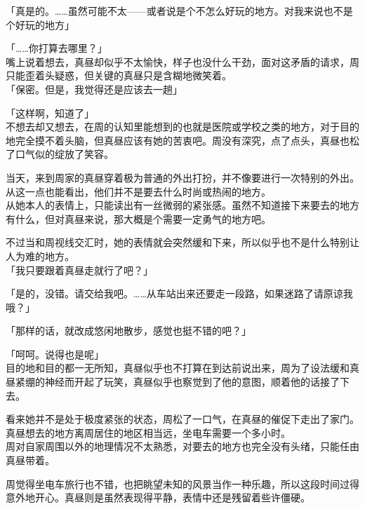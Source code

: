 「真是的。……虽然可能不太——或者说是个不怎么好玩的地方。对我来说也不是个好玩的地方」

「……你打算去哪里？」\\

嘴上说着想去，真昼却似乎不太愉快，样子也没什么干劲，面对这矛盾的请求，周只能歪着头疑惑，但关键的真昼只是含糊地微笑着。\\

「保密。但是，我觉得还是应该去一趟」

「这样啊，知道了」\\

不想去却又想去，在周的认知里能想到的也就是医院或学校之类的地方，对于目的地完全摸不着头脑，但真昼应该有她的苦衷吧。周没有深究，点了点头，真昼也松了口气似的绽放了笑容。\\

\vspace{2\baselineskip}

当天，来到周家的真昼穿着极为普通的外出打扮，并不像要进行一次特别的外出。从这一点也能看出，他们并不是要去什么时尚或热闹的地方。\\

从她本人的表情上，只能读出有一丝微弱的紧张感。虽然不知道接下来要去的地方有什么，但对真昼来说，那大概是个需要一定勇气的地方吧。

不过当和周视线交汇时，她的表情就会突然缓和下来，所以似乎也不是什么特别让人为难的地方。\\

「我只要跟着真昼走就行了吧？」

「是的，没错。请交给我吧。……从车站出来还要走一段路，如果迷路了请原谅我哦？」

「那样的话，就改成悠闲地散步，感觉也挺不错的吧？」

「呵呵。说得也是呢」\\

目的地和目的都一无所知，真昼似乎也不打算在到达前说出来，周为了设法缓和真昼紧绷的神经而开起了玩笑，真昼似乎也察觉到了他的意图，顺着他的话接了下去。

看来她并不是处于极度紧张的状态，周松了一口气，在真昼的催促下走出了家门。\\

真昼想去的地方离周居住的地区相当远，坐电车需要一个多小时。\\

周对自家周围以外的地理情况不太熟悉，对要去的地方也完全没有头绪，只能任由真昼带着。

周觉得坐电车旅行也不错，也把眺望未知的风景当作一种乐趣，所以这段时间过得意外地开心。真昼则是虽然表现得平静，表情中还是残留着些许僵硬。


